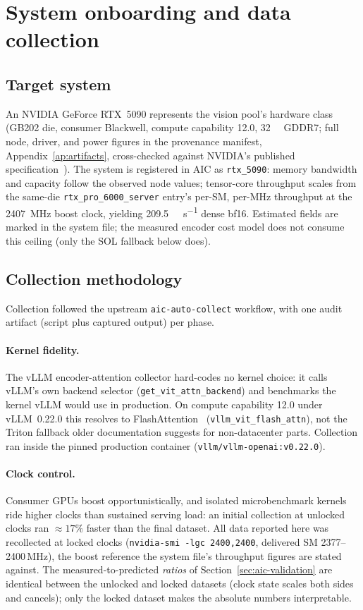 \section{System onboarding and data collection}
\label{sec:aic-collection}

\subsection{Target system}

An NVIDIA GeForce RTX~5090 represents the vision pool's hardware class
(GB202 die, consumer Blackwell, compute capability 12.0,
\SI{32}{\gibi\byte} GDDR7; full node, driver, and power figures in the
provenance manifest, Appendix~\ref{ap:artifacts}, cross-checked against
NVIDIA's published specification~\cite{NVIDIA5090Specs}). The system is
registered in AIC as \texttt{rtx\_5090}: memory bandwidth and capacity
follow the observed node values; tensor-core throughput scales from the
same-die \texttt{rtx\_pro\_6000\_server} entry's per-SM, per-MHz throughput
at the \SI{2407}{\mega\hertz} boost clock, yielding
\SI{209.5}{\tera\flop\per\second} dense bf16. Estimated fields are marked in
the system file; the measured encoder cost model does not consume this
ceiling (only the SOL fallback below does).

\subsection{Collection methodology}

Collection followed the upstream \texttt{aic-auto-collect} workflow, with
one audit artifact (script plus captured output) per phase.

\paragraph{Kernel fidelity.} The vLLM encoder-attention collector
hard-codes no kernel choice: it calls vLLM's own backend selector
(\texttt{get\_vit\_attn\_backend}) and benchmarks the kernel vLLM would use
in production. On compute capability 12.0 under vLLM~0.22.0 this resolves to
FlashAttention~\cite{Dao2023FlashAttention2}
(\texttt{vllm\_vit\_flash\_attn}), not the Triton fallback older
documentation suggests for non-datacenter parts. Collection ran inside the
pinned production container (\texttt{vllm/vllm-openai:v0.22.0}).

\paragraph{Clock control.} Consumer GPUs boost opportunistically, and
isolated microbenchmark kernels ride higher clocks than sustained serving
load: an initial collection at unlocked clocks ran ${\approx}17\%$ faster
than the final dataset. All data reported here was recollected at locked
clocks (\texttt{nvidia-smi -lgc 2400,2400}, delivered SM
2377--2400\,\si{\mega\hertz}), the boost reference the system file's
throughput figures are stated against. The measured-to-predicted
\emph{ratios} of Section~\ref{sec:aic-validation} are identical between the
unlocked and locked datasets (clock state scales both sides and cancels);
only the locked dataset makes the absolute numbers interpretable.

